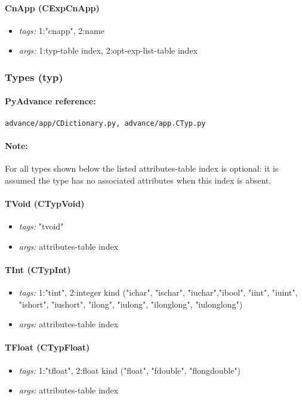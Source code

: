 \documentclass[11pt]{article}
\begin{document}
\paragraph{CnApp (CExpCnApp)}
\begin{itemize}
\item \emph{tags:} 1:"cnapp", 2:name
\item \emph{args:} 1:typ-table index, 2:opt-exp-list-table index
\end{itemize}

\subsubsection{Types (typ)}

\paragraph{PyAdvance reference:} {\tt advance/app/CDictionary.py, advance/app.CTyp.py}

\paragraph{Note:} For all types shown below the listed attributes-table index is
  optional: it is assumed the type has no associated attributes when this index
  is absent.

\paragraph{TVoid (CTypVoid)}
\begin{itemize}
\item \emph{tags:} "tvoid"
\item \emph{args:} attributes-table index
\end{itemize}

\paragraph{TInt (CTypInt)}
\begin{itemize}
\item \emph{tags:} 1:"tint", 2:integer kind ("ichar", "ischar", "iuchar","ibool",
   "iint", "iuint", "ishort", "iushort", "ilong", "iulong", "ilonglong", "iulonglong")
\item \emph{args:} attributes-table index
\end{itemize}

\paragraph{TFloat (CTypFloat)}
\begin{itemize}
\item \emph{tags:} 1:"tfloat", 2:float kind ("float", "fdouble", "flongdouble")
\item \emph{args:} attributes-table index
\end{itemize}
\end{document}
